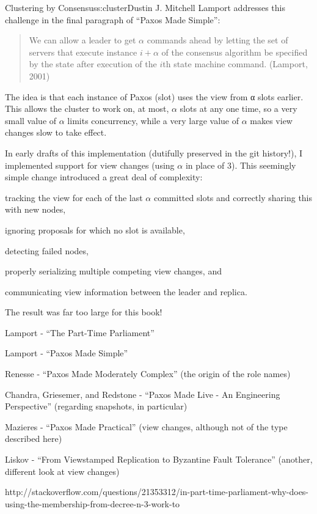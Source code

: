 \begin{aosachapter}{Clustering by Consensus}{s:cluster}{Dustin J. Mitchell}
Lamport addresses this challenge in the final paragraph of ``Paxos Made
Simple'':

\begin{quote}
We can allow a leader to get $\alpha$ commands ahead by letting the set
of servers that execute instance $i+\alpha$ of the consensus algorithm
be specified by the state after execution of the $i$th state machine
command. (Lamport, 2001)
\end{quote}

The idea is that each instance of Paxos (slot) uses the view from α
slots earlier. This allows the cluster to work on, at most, $\alpha$
slots at any one time, so a very small value of $\alpha$ limits
concurrency, while a very large value of $\alpha$ makes view changes
slow to take effect.

In early drafts of this implementation (dutifully preserved in the git
history!), I implemented support for view changes (using $\alpha$ in
place of 3). This seemingly simple change introduced a great deal of
complexity:

\begin{aosaitemize}

\item
  tracking the view for each of the last $\alpha$ committed slots and
  correctly sharing this with new nodes,
\item
  ignoring proposals for which no slot is available,
\item
  detecting failed nodes,
\item
  properly serializing multiple competing view changes, and
\item
  communicating view information between the leader and replica.
\end{aosaitemize}

The result was far too large for this book!

\label{references}

\begin{aosaitemize}

\item
  Lamport - ``The Part-Time Parliament''
\item
  Lamport - ``Paxos Made Simple''
\item
  Renesse - ``Paxos Made Moderately Complex'' (the origin of the role
  names)
\item
  Chandra, Griesemer, and Redstone - ``Paxos Made Live - An Engineering
  Perspective'' (regarding snapshots, in particular)
\item
  Mazieres - ``Paxos Made Practical'' (view changes, although not of the
  type described here)
\item
  Liskov - ``From Viewstamped Replication to Byzantine Fault Tolerance''
  (another, different look at view changes)
\item
  http://stackoverflow.com/questions/21353312/in-part-time-parliament-why-does-using-the-membership-from-decree-n-3-work-to
\end{aosaitemize}

\end{aosachapter}
